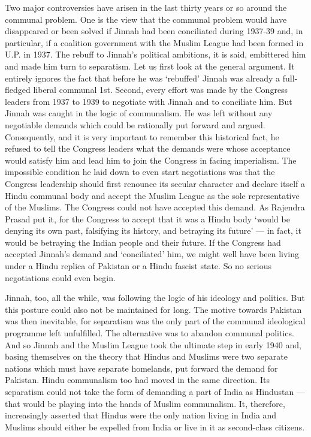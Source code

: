 Two major controversies have arisen in the last thirty years or so around the communal problem. One is the view that the communal problem would have disappeared or been solved if Jinnah had been conciliated during 1937-39 and, in particular, if a coalition government with the Muslim League had been formed in U.P. in 1937. The rebuff to Jinnah’s political ambitions, it is said, embittered him and made him turn to separatism. Let us first look at the general argument. It entirely ignores the fact that before he was ‘rebuffed’ Jinnah was already a full- fledged liberal communal 1st. Second, every effort was made by the Congress leaders from 1937 to 1939 to negotiate with Jinnah and to conciliate him. But Jinnah was caught in the logic of communalism. He was left without any negotiable demands which could be rationally put forward and argued. Consequently, and it is very important to remember this historical fact, he refused to tell the Congress leaders what the demands were whose acceptance would satisfy him and lead him to join the Congress in facing imperialism. The impossible condition he laid down to even start negotiations was that the Congress leadership should first renounce its secular character and declare itself a Hindu communal body and accept the Muslim League as the sole representative of the Muslims. The Congress could not have accepted this demand. As Rajendra Prasad put it, for the Congress to accept that it was a Hindu body ‘would be denying its own past, falsifying its history, and betraying its future’ — in fact, it would be betraying the Indian people and their future. If the Congress had accepted Jinnah’s demand and ‘conciliated’ him, we might well have been living under a Hindu replica of Pakistan or a Hindu fascist state. So no serious negotiations could even begin. 

Jinnah, too, all the while, was following the logic of his ideology and politics. But this posture could also not be maintained for long. The motive towards Pakistan was then inevitable, for separatism was the only part of the communal ideological programme left unfulfilled. The alternative was to abandon communal politics. And so Jinnah and the Muslim League took the ultimate step in early 1940 and, basing themselves on the theory that Hindus and Muslims were two separate nations which must have separate homelands, put forward the demand for Pakistan. Hindu communalism too had moved in the same direction. Its separatism could not take the form of demanding a part of India as Hindustan — that would be playing into the hands of Muslim communalism. It, therefore, increasingly asserted that Hindus were the only nation living in India and Muslims should either be expelled from India or live in it as second-class citizens. 

